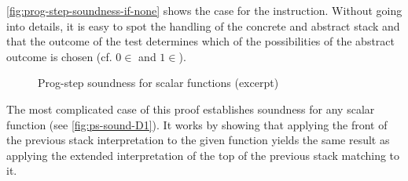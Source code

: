 \autoref{fig:prog-step-soundness-if-none} shows the case for
the  instruction. Without going into details, it is easy
to spot the handling of the concrete and abstract stack and that the
outcome of the test determines which of the possibilities of the
abstract outcome is chosen (cf. $0\in$ and $1\in$).

\begin{figure}[tp]
  \SoundnessCaseDOne
  \caption{Prog-step soundness for scalar functions (excerpt)}
  \label{fig:ps-sound-D1}
\end{figure}

The most complicated case of this proof establishes soundness for any
scalar function (see \autoref{fig:ps-sound-D1}).
It works by showing that applying the front of the previous
stack interpretation to the given function yields the same result as applying
the extended interpretation of the top of the previous stack matching to it.


